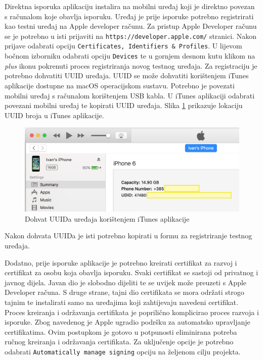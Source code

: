 \documentclass[times, utf8, diplomski, numeric]{fer}
\begin{document}
\begin{appendices}
Direktna isporuka aplikaciju instalira na mobilni uređaj koji je direktno povezan s računalom koje obavlja isporuku. Uređaj je prije isporuke potrebno registrirati kao testni uređaj na Apple developer računu. Za pristup Apple Developer računu se je potrebno u isti prijaviti na \verb|https://developer.apple.com/| stranici. Nakon prijave odabrati opciju \verb|Certificates, Identifiers & Profiles|. U lijevom bočnom izborniku odabrati opciju \verb|Devices| te u gornjem desnom kutu klikom na \textit{plus} ikonu pokrenuti proces registriranja novog testnog uređaja. Za registraciju je potrebno dohvatiti UUID uređaja. UUID se može dohvatiti korištenjem iTunes aplikacije dostupne na macOS operacijskom sustavu. Potrebno je povezati mobilni uređaj s računalom korištenjem USB kabla. U iTunes aplikaciji odabrati povezani mobilni uređaj te kopirati UUID uređaja. Slika \ref{fig:iTunesUUID} prikazuje lokaciju UUID broja u iTunes aplikacije.

\begin{figure}
\centering
\includegraphics[scale=0.5]{iTunesUUID}
\caption{Dohvat UUIDa uređaja korištenjem iTunes aplikacije}
\label{fig:iTunesUUID}
\end{figure}

Nakon dohvata UUIDa je isti potrebno kopirati u formu za registriranje testnog uređaja.

Dodatno, prije isporuke aplikacije je potrebno kreirati certifikat za razvoj i certifikat za osobu koja obavlja isporuku. Svaki certifikat se sastoji od privatnog i javnog dijela. Javan dio je slobodno dijeliti te se uvijek može preuzeti s Apple Developer računa. S druge strane, tajni dio certifikata se mora održati strogo tajnim te instalirati samo na uređajima koji zahtijevaju navedeni certifikat. Proces kreiranja i održavanja certifikata je poprilično komplicirao proces razvoja i isporuke. Zbog navedenog je Apple ugradio podršku za automatsko upravljanje certifikatima. Ovim postupkom je gotovo u potpunosti eliminirana potreba ručnog kreiranja i održavanja certifikata. Za uključenje opcije je potrebno odabrati \verb|Automatically manage signing| opciju na željenom cilju projekta.


\end{appendices}
\end{document}
